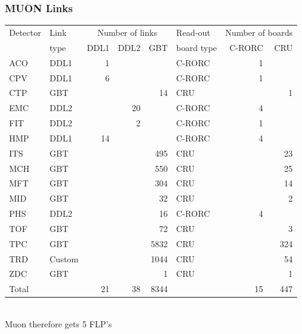 \documentclass{beamer}
\begin{document}
\begin{frame}
  \frametitle{MUON Links}
  \tiny{\begin{tabular}{|l|l|r|r|r|l|r|r|}
   Detector  &      Link    &  \multicolumn{3}{c}{ Number of links}   &     Read-out &   \multicolumn{2}{c}{Number of boards} \\
             &      type    & DDL1& DDL2 &  GBT  &  board type&   C-RORC& CRU \\ \hline\hline
    ACO      &     DDL1     &  1  &      &       &  C-RORC    &      1   &   \\ 
    CPV      &     DDL1     &  6  &      &       &  C-RORC    &      1   &\\ 
    CTP      &    GBT       &     &      &    14 &  CRU       &          &     1\\ 
    EMC      &   DDL2       &     &   20 &       &  C-RORC    &      4   &\\ 
    FIT      &     DDL2     &     &    2 &       &  C-RORC    &      1   &\\ 
    HMP      &     DDL1     &  14 &      &       &  C-RORC    &      4   &\\ 
    ITS      &     GBT      &     &      &   495 &  CRU       &          &               23\\ 
\rowcolor{MRed}    MCH      &     GBT      &     &      &   550 &  CRU       &          &               25\\ 
\rowcolor{MRed}    MFT      &     GBT      &     &      &   304 &  CRU       &          &               14\\ 
\rowcolor{MRed}    MID      &     GBT      &     &      &    32 &  CRU       &          &                2\\ 
    PHS      &     DDL2     &     &      &    16 &  C-RORC    &     4    &\\ 
    TOF      &     GBT      &     &      &    72 &  CRU       &          &               3\\ 
    TPC      &     GBT      &     &      &  5832 &  CRU       &          &             324\\ 
    TRD      &     Custom   &     &      &  1044 &  CRU       &          &              54\\ 
    ZDC      &     GBT      &     &      &     1 &  CRU       &          &               1\\  \hline
    Total    &               & 21 &  38  &  8344 &            &   15     &          447\\ 
            \end{tabular}}\\
            Muon therefore gets 5 FLP's
\end{frame}
\end{document}
